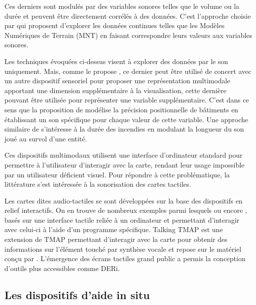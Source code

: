 
Ces derniers sont  modulés par des variables sonores telles que le volume ou la durée et peuvent être directement corrélés à des données. C'est l'approche choisie par \cite{Schito2018} qui proposent d'explorer les données continues telles que les Modèles Numériques de Terrain (MNT) en faisant correspondre leurs valeurs aux variables sonores.

\newpar{}


Les techniques évoquées ci-dessus visent à explorer des données par le son uniquement. Mais, comme le propose \cite{Krygier1994}, ce dernier peut être utilisé de concert avec un autre dispositif sensoriel pour proposer une représentation multimodale apportant une dimension supplémentaire à la visualisation, cette dernière pouvant être utilisée pour représenter une variable supplémentaire. C'est dans ce sens que la proposition de \cite{Bearman2010} modélise la précision positionnelle de bâtiments en établissant un son spécifique pour chaque valeur de cette variable. Une approche similaire de \cite{Foteinou2022} s'intéresse à la durée des incendies en modulant la longueur du son joué au survol d'une entité.

Ces dispositifs multimodaux utilisent une interface d'ordinateur standard pour permettre à l'utilisateur d'interagir avec la carte, rendant leur usage impossible par un utilisateur déficient visuel. Pour répondre à cette problématique, la littérature s'est intéressée à la sonorisation des cartes tactiles.

\newpar{}


Les cartes dites audio-tactiles se sont développées sur la base des dispositifs en relief interactifs. On en trouve de nombreux exemples parmi lesquels \cite{Loetzsch1994} ou encore \cite{Landau2001}, basés sur une interface tactile reliée à un ordinateur et permettant d'interagir avec celui-ci à l'aide d'un programme spécifique.
Talking TMAP \cite{Miele2006} est une extension de TMAP \cite{Miele2004} permettant d'interagir avec la carte pour obtenir des informations sur l'élément touché par synthèse vocale et repose sur le matériel conçu par \cite{Landau2001}. L'émergence des écrans tactiles grand public a permis la conception d'outils plus accessibles \cite{Brock2015} comme DERi.

\subsection{Les dispositifs d'aide in situ}

